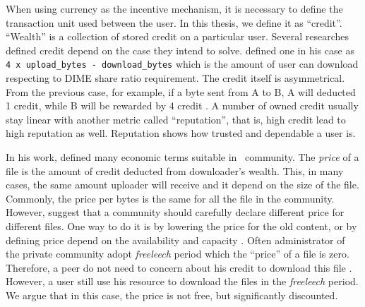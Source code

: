 When using currency as the incentive mechanism, it is necessary to define the transaction unit used between the user. In this thesis, we define it as ``credit''. ``Wealth'' is a collection of stored credit on a particular user. Several researches defined credit depend on the case they intend to solve. \citeauthor{2012:economicbt:kash} defined one in his case as \texttt{4 x upload\_bytes - download\_bytes} which is the amount of user can download respecting to DIME share ratio requirement. The credit itself is asymmetrical. From the previous case, for example, if a byte sent from A to B, A will deducted 1 credit, while B will be rewarded by 4 credit \cite{2012:economicbt:kash}. A number of owned credit usually stay linear with another metric called ``reputation'', that is, high credit lead to high reputation as well. Reputation shows how trusted and dependable a user is. 

In his work, \citeauthor{2012:economicbt:kash} defined many economic terms suitable in \bt~community. The \textit{price} of a file is the amount of credit deducted from downloader's wealth. This, in many cases, the same amount uploader will receive and it depend on the size of the file. Commonly, the price per bytes is the same for all the file in the community. However, \citeauthor{2012:economicbt:kash} suggest that a community should carefully declare different price for different files. One way to do it is by lowering the price for the old content, or by defining price depend on the availability and capacity \cite{2012:economicbt:kash}. Often administrator of the private community adopt \textit{freeleech} period which the ``price'' of a file is zero. Therefore, a peer do not need to concern about his credit to download this file \cite{2010:crashsustain:rahman}. However, a user still use his resource to download the files in the \textit{freeleech} period. We argue that in this case, the price is not free, but significantly discounted.


